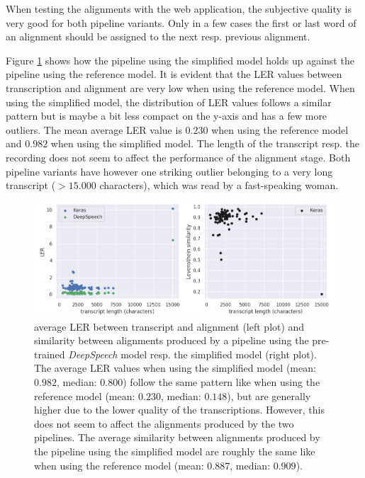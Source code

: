 When testing the alignments with the web application, the subjective quality is very good for both pipeline variants. Only in a few cases the first or last word of an alignment should be assigned to the next resp. previous alignment.

Figure \ref{pipeline_scatterplot_ls_en} shows how the pipeline using the simplified model holds up against the pipeline using the reference model. It is evident that the \ac{LER} values between transcription and alignment are very low when using the reference model. When using the simplified model, the distribution of \ac{LER} values follows a similar pattern but is maybe a bit less compact on the y-axis and has a few more outliers. The mean average \ac{LER} value is $0.230$ when using the reference model and $0.982$ when using the simplified model. The length of the transcript resp. the recording does not seem to affect the performance of the alignment stage. Both pipeline variants have however one striking outlier belonging to a very long transcript ($>15.000$ characters), which was read by a fast-speaking woman. 

\begin{figure}[h!]
	\includegraphics[width=\linewidth]{./img/scatterplot_ls.png}
	\caption{average \ac{LER} between transcript and alignment (left plot) and similarity between alignments produced by a pipeline using the pre-trained \textit{DeepSpeech} model resp. the simplified model (right plot). The average \ac{LER} values when using the simplified model (mean: $0.982$, median: $0.800$) follow the same pattern like when using the reference model (mean: $0.230$, median: $0.148$), but are generally higher due to the lower quality of the transcriptions. However, this does not seem to affect the alignments produced by the two pipelines. The average similarity between alignments produced by the pipeline using the simplified model are roughly the same like when using the reference model (mean: $0.887$, median: $0.909$).}
	\label{pipeline_scatterplot_ls_en}
\end{figure}

